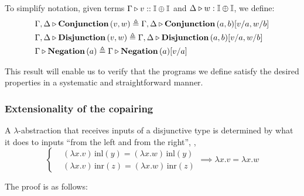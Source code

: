 To simplify notation, given terms $\Gamma \triangleright v::\mathbb{I} \oplus \mathbb{I}$ and $\Delta \triangleright  w:\mathbb{I} \oplus \mathbb{I}$, we define:
\begin{equation}
  \begin{split}
    &\Gamma, \Delta  \triangleright \textbf{Conjunction}\,(v,w) \triangleq \Gamma, \Delta  \triangleright \textbf{Conjunction}\,(a,b) [v/a, w/b] \\
    & \Gamma, \Delta  \triangleright \textbf{Disjunction}\,(v,w) \triangleq \Gamma, \Delta  \triangleright \textbf{Disjunction}\,(a,b) [v/a, w/b] \\
     &\Gamma \triangleright \textbf{Negation}\,(a) \triangleq \Gamma \triangleright \textbf{Negation}\,(a) [v/a]
  \end{split}
\end{equation}

 This result will enable us to verify that the programs we define satisfy the desired properties in a systematic and straightforward manner.



\subsubsection{Extensionality of the copairing}

A $\lambda$-abstraction that receives inputs of a disjunctive type is determined by what it does to inputs ``from the left and from the right'', \ie,
\[
\left\{
\begin{aligned}
&(\lambda x.v)\, \text{inl}(y) = (\lambda x.w)\, \text{inl}(y) \\
&(\lambda x.v)\, \text{inr}(z) =(\lambda x.w)\, \text{inr}(z)
\end{aligned}
\right.
\implies \lambda x.v = \lambda x.w
\]

The proof is as follows:

